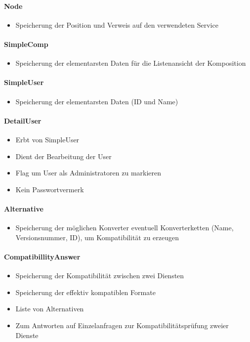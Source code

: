 \paragraph{Node} 
\begin{itemize}
	\item Speicherung der Position und Verweis auf den verwendeten Service
\end{itemize}
\paragraph{SimpleComp}
\begin{itemize}
	\item Speicherung der elementarsten Daten für die Listenansicht der Komposition
\end{itemize}
\paragraph{SimpleUser}
\begin{itemize}
	\item Speicherung der elementarsten Daten (ID und Name)
\end{itemize}
\paragraph{DetailUser}
\begin{itemize}
	\item Erbt von SimpleUser
	\item Dient der Bearbeitung der User
	\item Flag um User als Administratoren zu markieren
	\item Kein Passwortvermerk
\end{itemize}
\paragraph{Alternative}
\begin{itemize}
	\item Speicherung der möglichen Konverter eventuell Konverterketten (Name, Versionsnummer, ID), um Kompatibilität zu erzeugen
\end{itemize}
\paragraph{CompatibillityAnswer}
\begin{itemize}
	\item Speicherung der Kompatibilität zwischen zwei Diensten
	\item Speicherung der effektiv kompatiblen Formate
	\item Liste von Alternativen
	\item Zum Antworten auf Einzelanfragen zur Kompatibilitätsprüfung zweier Dienste
\end{itemize}
